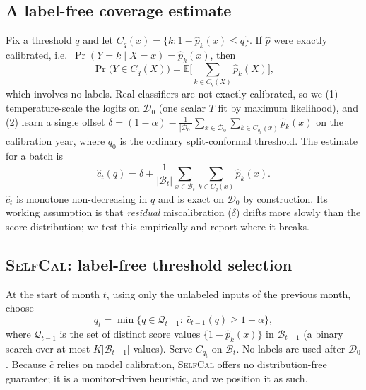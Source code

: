 \documentclass[conference]{IEEEtran}
\newcommand{\selfcal}{\textsc{SelfCal}}
\newcommand{\chat}{\hat{c}}
\begin{document}
\subsection{A label-free coverage estimate}\label{sec:method-est}
Fix a threshold $q$ and let $C_q(x)=\{k:1-\hat p_k(x)\le q\}$. If $\hat p$ were exactly calibrated, i.e.\ $\Pr(Y{=}k\mid X{=}x)=\hat p_k(x)$, then
\begin{equation}
\Pr\big(Y\in C_q(X)\big)=\mathbb{E}\Big[\textstyle\sum_{k\in C_q(X)}\hat p_k(X)\Big],
\label{eq:est}
\end{equation}
which involves no labels. Real classifiers are not exactly calibrated, so we (1) temperature-scale the logits on $\mathcal{D}_0$ (one scalar $T$ fit by maximum likelihood), and (2) learn a single offset $\delta=(1-\alpha)-\frac{1}{|\mathcal{D}_0|}\sum_{x\in\mathcal{D}_0}\sum_{k\in C_{q_0}(x)}\hat p_k(x)$ on the calibration year, where $q_0$ is the ordinary split-conformal threshold. The estimate for a batch is
\begin{equation}
\chat_t(q)=\delta+\frac{1}{|\mathcal{B}_t|}\sum_{x\in\mathcal{B}_t}\sum_{k\in C_q(x)}\hat p_k(x).
\label{eq:chat}
\end{equation}
$\chat_t$ is monotone non-decreasing in $q$ and is exact on $\mathcal{D}_0$ by construction. Its working assumption is that \emph{residual} miscalibration ($\delta$) drifts more slowly than the score distribution; we test this empirically and report where it breaks.

\subsection{\selfcal{}: label-free threshold selection}
At the start of month $t$, using only the unlabeled inputs of the previous month, choose
\begin{equation}
q_t=\min\{q\in\mathcal{Q}_{t-1}:\ \chat_{t-1}(q)\ge 1-\alpha\},
\end{equation}
where $\mathcal{Q}_{t-1}$ is the set of distinct score values $\{1-\hat p_k(x)\}$ in $\mathcal{B}_{t-1}$ (a binary search over at most $K|\mathcal{B}_{t-1}|$ values). Serve $C_{q_t}$ on $\mathcal{B}_t$. No labels are used after $\mathcal{D}_0$. Because $\chat$ relies on model calibration, \selfcal{} offers no distribution-free guarantee; it is a monitor-driven heuristic, and we position it as such.
\end{document}
